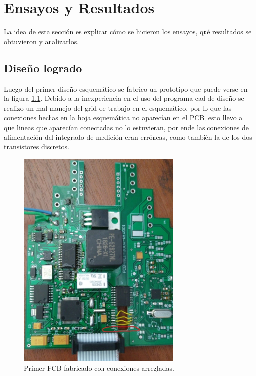 
\chapter{Ensayos y Resultados} %
\label{Chapter4} %

La idea de esta sección es explicar cómo se hicieron los ensayos, qué resultados se obtuvieron y analizarlos.


\section{Diseño logrado}

Luego del primer diseño esquemático se fabrico un prototipo que puede verse en la figura  \ref{fig:proto1}. Debido a la inexperiencia en el uso del programa cad de diseño se realizo un mal manejo del grid de trabajo en el esquemático, por lo que las conexiones hechas en la hoja esquemática no aparecían en el PCB, esto llevo a que lineas que aparecían conectadas no lo estuvieran, por ende las conexiones de alimentación del integrado de medición eran erróneas, como también la de los dos transistores discretos.

\begin{figure}[!htb]
	\centering
	\includegraphics[width=80mm,keepaspectratio]{Figures/placaarmada1.jpeg}
	\caption{Primer PCB fabricado con conexiones arregladas.}
	\label{fig:proto1}
\end{figure}

